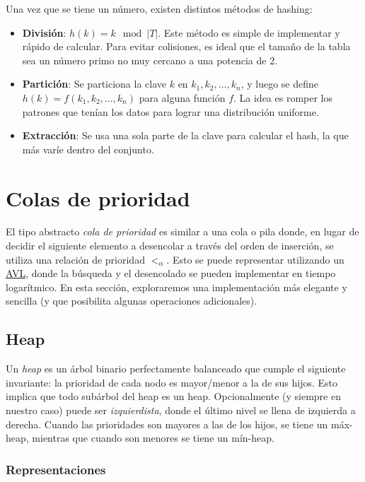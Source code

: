 \documentclass{article}
\begin{document}
Una vez que se tiene un número, existen distintos métodos de hashing:
\begin{itemize}
    \item \textbf{División}: $h(k) = k\mod{|T|}$. Este método es simple de implementar y rápido de calcular. Para evitar colisiones, es ideal que el tamaño de la tabla sea un número primo no muy cercano a una potencia de $2$.
    \item \textbf{Partición}: Se particiona la clave $k$ en $k_1, k_2, ..., k_n$, y luego se define $h(k) = f(k_1, k_2, ..., k_n)$ para alguna función $f$. La idea es romper los patrones que tenían los datos para lograr una distribución uniforme.
    \item \textbf{Extracción}: Se usa una sola parte de la clave para calcular el hash, la que más varíe dentro del conjunto.
\end{itemize}

\section{Colas de prioridad}

El tipo abstracto \textit{cola de prioridad} es similar a una cola o pila donde, en lugar de decidir el siguiente elemento a desencolar a través del orden de inserción, se utiliza una relación de prioridad $<_{\alpha}$. Esto se puede representar utilizando un \hyperref[subsec-avl]{AVL}, donde la búsqueda y el desencolado se pueden implementar en tiempo logarítmico. En esta sección, exploraremos una implementación más elegante y sencilla (y que posibilita algunas operaciones adicionales).

\subsection{Heap}

Un \textit{heap} es un árbol binario perfectamente balanceado que cumple el siguiente invariante: la prioridad de cada nodo es mayor/menor a la de sus hijos. Esto implica que todo subárbol del heap es un heap. Opcionalmente (y siempre en nuestro caso) puede ser \textit{izquierdista}, donde el último nivel se llena de izquierda a derecha. Cuando las prioridades son mayores a las de los hijos, se tiene un máx-heap, mientras que cuando son menores se tiene un mín-heap.

\subsubsection{Representaciones}
\end{document}
